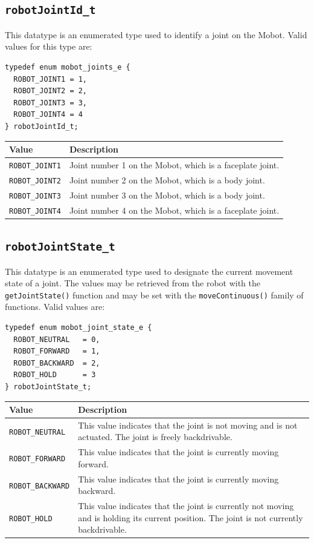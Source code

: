 \documentclass{article}
\begin{document}
\subsection{\label{sec:robotJointId_t}\texttt{robotJointId\_t}}
This datatype is an enumerated type used to identify a joint on the Mobot. Valid
values for this type are:
\begin{verbatim}
typedef enum mobot_joints_e {
  ROBOT_JOINT1 = 1,
  ROBOT_JOINT2 = 2,
  ROBOT_JOINT3 = 3,
  ROBOT_JOINT4 = 4
} robotJointId_t;
\end{verbatim}

\begin{tabular}{p{3cm}p{10cm}} \hline 
Value & Description \\
\hline 
\texttt{ROBOT\_JOINT1} & Joint number 1 on the Mobot, which is a faceplate joint. \\
\texttt{ROBOT\_JOINT2} & Joint number 2 on the Mobot, which is a body joint. \\
\texttt{ROBOT\_JOINT3} & Joint number 3 on the Mobot, which is a body joint. \\
\texttt{ROBOT\_JOINT4} & Joint number 4 on the Mobot, which is a faceplate joint. \\
\hline
\end{tabular}

\subsection{\label{sec:robotJointState_t}\texttt{robotJointState\_t}}
This datatype is an enumerated type used to designate the current 
movement state of a joint. The values may be retrieved from the 
robot with the \texttt{getJointState()} function and may be set 
with the \texttt{moveContinuous()} family of functions. Valid values are:

\begin{verbatim}
typedef enum mobot_joint_state_e {
  ROBOT_NEUTRAL   = 0,
  ROBOT_FORWARD   = 1,
  ROBOT_BACKWARD  = 2,
  ROBOT_HOLD      = 3
} robotJointState_t;
\end{verbatim}

\begin{tabular}{p{3.3cm}p{11.5cm}} \hline 
Value & Description \\
\hline
\texttt{ROBOT\_NEUTRAL}& This value indicates that the joint is not moving and is not actuated. The joint is freely backdrivable. \\
\texttt{ROBOT\_FORWARD}& This value indicates that the joint is currently moving forward. \\
\texttt{ROBOT\_BACKWARD}& This value indicates that the joint is currently moving backward. \\
\texttt{ROBOT\_HOLD}& This value indicates that the joint is currently not moving and is holding its current position. The joint is not currently backdrivable. \\
\hline
\end{tabular}
\end{document}
